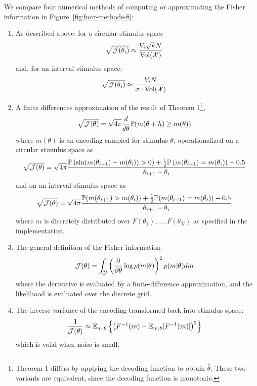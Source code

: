 We compare four numerical methods of computing or approximating the Fisher information in Figure~\ref{fig:four-methods-fi}:
\begin{enumerate}
\item As described above: for a circular stimulus space
\begin{equation}
  \sqrt{\mathcal{J}(\theta_i)} \approx  \frac{V_i \sqrt{\kappa} N}{\operatorname{Vol}(\mathcal{X})}
\end{equation}
and, for an interval stimulus space:
\begin{equation}
    \sqrt{\mathcal{J}(\theta_i)} \approx  \frac{V_i N}{\sigma \cdot \operatorname{Vol}(\mathcal{X})}
\end{equation}
\item A finite differences approximation of the result of Theorem 1\footnote{Theorem 1 differs by applying the decoding function to obtain $\widehat{\theta}$. These two variants are equivalent, since the decoding function is monotonic.},
\begin{equation}
    \sqrt{\mathcal{J}(\theta)} = \sqrt{4\pi} \frac{d}{d\theta} \mathbb{P}(m(\theta+h) \geq m(\theta))
\end{equation}
where $m(\theta)$ is an encoding sampled for stimulus $\theta$, operationalized on a circular stimulus space as
\begin{equation}
    \sqrt{\mathcal{J}(\theta)} = \sqrt{4\pi} \frac{\mathbb{P}\left(\sin(m(\theta_{i+1})- m(\theta_i)) > 0\right) + \frac{1}{2}\mathbb{P}\left(m(\theta_{i+1}) = m(\theta_i)\right) - 0.5}{\theta_{i+1}-\theta_i}
\end{equation}
and on an interval stimulus space as
\begin{equation}
    \sqrt{\mathcal{J}(\theta)} = \sqrt{4\pi} \frac{\mathbb{P}(m(\theta_{i+1}) > m(\theta_i)) + \frac{1}{2}\mathbb{P}(m(\theta_{i+1}) = m(\theta_i)) - 0.5}{\theta_{i+1}-\theta_i}
\end{equation}
where $m$ is discretely distributed over $F(\theta_1), \dots, F(\theta_N)$ as specified in the implementation.

\item The general definition of the Fisher information
\begin{equation}
    \mathcal{J}(\theta) = \int_{\mathcal{Y}} \left(\frac{\partial}{\partial \theta} \log p(m | \theta)\right)^2 p(m|\theta) dm
\end{equation}
where the derivative is evaluated by a finite-difference approximation, and the likelihood is evaluated over the discrete grid.

\item The inverse variance of the encoding transformed back into stimulus space:
\begin{equation}
    \frac{1}{\mathcal{J}(\theta)} \approx \mathbb{E}_{m|\theta} \left\{\left(F^{-1}(m) - \mathbb{E}_{m|\theta}[F^{-1}(m)]\right)^2\right\}
\end{equation}
which is valid when noise is small.
\end{enumerate}

